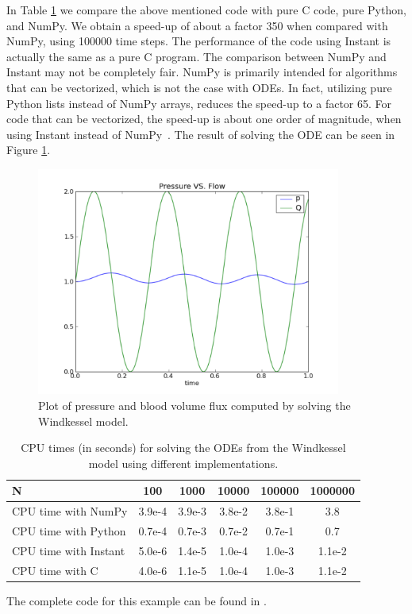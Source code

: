 In Table \ref{wilbers:fig:speed-up} we compare the above mentioned code with
pure C code, pure Python, and NumPy.  
We obtain a speed-up of about a factor 350 when compared with NumPy, using
100000 time steps. The performance of the code using Instant is actually the same as a pure C program. 
The comparison between NumPy and Instant may not be
completely fair. NumPy is primarily intended for algorithms that can be vectorized,
which is not the case with ODEs. In fact, utilizing pure Python
lists instead of NumPy arrays, reduces the speed-up to a factor 65. For code
that can be vectorized, the speed-up is about one order of magnitude, when 
using Instant instead of NumPy~\citep{WilbersLangtangenO2009}.
The result of solving the ODE can be seen in Figure
\ref{wilbers:fig:fig1}. 

\begin{figure}
\begin{center}
\includegraphics[width=100mm]{chapters/wilbers/pdf/pressure_plot.pdf}
\caption{Plot of pressure and blood volume flux computed by solving the Windkessel model.}
\label{wilbers:fig:fig1}
\end{center}
\end{figure}

\begin{table}[h]
\begin{center}
\begin{tabular}{|l|c|c|c|c|c|} \hline
N                     & 100     & 1000   & 10000  & 100000 & 1000000 \\ \hline
CPU time with NumPy   & 3.9e-4  & 3.9e-3 & 3.8e-2 & 3.8e-1 & 3.8     \\ \hline
CPU time with Python  & 0.7e-4  & 0.7e-3 & 0.7e-2 & 0.7e-1 & 0.7     \\ \hline
CPU time with Instant & 5.0e-6  & 1.4e-5 & 1.0e-4 & 1.0e-3 & 1.1e-2  \\ \hline
CPU time with C       & 4.0e-6  & 1.1e-5 & 1.0e-4 & 1.0e-3 & 1.1e-2  \\ \hline
\end{tabular}
\caption{CPU times (in seconds) for solving the ODEs from the  Windkessel model using different implementations.}
\label{wilbers:fig:speed-up}
\end{center}
\end{table}
The complete code for this example can be found in .


